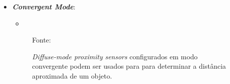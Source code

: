 \documentclass[xcolor=dvipsnames, aspectratio=169]{beamer}
\begin{document}
\begin{frame}
\begin{itemize}
		\newpage
		\item \textbf{\textit{Convergent Mode}}:
		\begin{itemize}
			\item 
		\end{itemize}
		\begin{figure}
			\centering
			{Fonte: \cite{everett1995sensors}}
			\caption{\textit{Diffuse-mode proximity sensors} configurados em modo convergente podem ser usados para para determinar a distância aproximada de um objeto.}
			\label{fig:11_optical_sensor_convergent_mode}
		\end{figure}
	\end{itemize}
\end{frame}



\begin{frame}
    \printbibliography
\end{frame}


\begin{frame}
\titlepage %
\end{frame}
\end{document}
